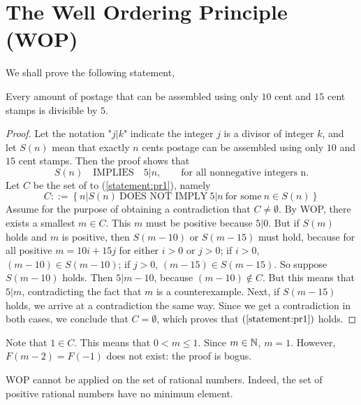 \chapter{The Well Ordering Principle (WOP)}

\begin{pr}
    We shall prove the following statement,
    \begin{lemPr}
        Every amount of postage that can be assembled using only $10$ cent
        and $15$ cent stamps is divisible by $5$.
    \end{lemPr}

    \begin{proof}
        Let the notation "$j\left|\right.k$" indicate the integer $j$
        is a divisor of integer $k$, and let $S(n)$ mean that exactly $n$ cents
        postage can be assembled using only $10$ and $15$ cent stamps. Then
        the proof shows that
        \begin{equation} \label{statement:pr1}
            S(n) \quad \text{IMPLIES} \quad 5 \left|\right. n, \qquad \text{for all nonnegative integers n.}
        \end{equation}
        Let $C$ be the set of  to (\ref{statement:pr1}), namely
        \begin{equation*}
            C ::= \left\{ n \left|\right. S(n) \ \text{DOES NOT IMPLY} \ 5 \left|\right. n \ \text{for some} \ n \in S(n) \right\}
        \end{equation*}
        Assume for the purpose of obtaining a contradiction that $C \neq \emptyset$.
        By WOP, there exists a smallest $m \in C$. This $m$ must be positive
        because $5 \left|\right. 0$.
        \beautyBr
        But if $S(m)$ holds and $m$ is positive, then $S(m - 10)$ or $S(m - 15)$
        must hold, because for all positive $m = 10i + 15j$ for either $i > 0$ or $j > 0$; if
        $i > 0$, $(m - 10) \in S(m - 10)$; if $j > 0$, $(m - 15) \in S(m - 15)$.
        \beautyBr
        So suppose $S(m - 10)$ holds. Then $5 \left|\right. m - 10$, because $(m - 10) \notin C$.
        \beautyBr
        But this means that $5 \left|\right. m$, contradicting the fact that
        $m$ is a counterexample.
        \beautyBr
        Next, if $S(m - 15)$ holds, we arrive at a contradiction the same way.
        \beautyBr
        Since we get a contradiction in both cases, we conclude that $C = \emptyset$,
        which proves that $(\ref{statement:pr1})$ holds.
    \end{proof}
\end{pr}

\begin{pr}
    Note that $1 \in C$. This means that $0 < m \leq 1$. Since $m \in \mathbb{N}$,
    $m = 1$. However, $F(m - 2) = F(-1)$ does not exist: the proof is bogus.
\end{pr}

\begin{pr}
    WOP cannot be applied on the set of rational numbers. Indeed, the set
    of positive rational numbers have no minimum element.
\end{pr}
